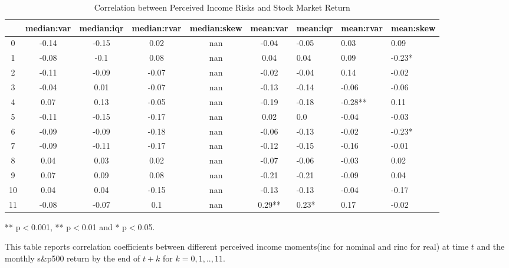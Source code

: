 
\begin{table}[ht]
\centering
\begin{adjustbox}{width={\textwidth}}
\begin{threeparttable}
\caption{Correlation between Perceived Income Risks and Stock Market Return}
\label{macro_corr}
\begin{tabular}{cccccclll}
\toprule
{} & median:var & median:iqr & median:rvar & median:skew & mean:var & mean:iqr & mean:rvar & mean:skew \\
\midrule
0  &      -0.14 &      -0.15 &        0.02 &         nan &    -0.04 &    -0.05 &      0.03 &      0.09 \\
1  &      -0.08 &       -0.1 &        0.08 &         nan &     0.04 &     0.04 &      0.09 &    -0.23* \\
2  &      -0.11 &      -0.09 &       -0.07 &         nan &    -0.02 &    -0.04 &      0.14 &     -0.02 \\
3  &      -0.04 &       0.01 &       -0.07 &         nan &    -0.13 &    -0.14 &     -0.06 &     -0.06 \\
4  &       0.07 &       0.13 &       -0.05 &         nan &    -0.19 &    -0.18 &   -0.28** &      0.11 \\
5  &      -0.11 &      -0.15 &       -0.17 &         nan &     0.02 &      0.0 &     -0.04 &     -0.03 \\
6  &      -0.09 &      -0.09 &       -0.18 &         nan &    -0.06 &    -0.13 &     -0.02 &    -0.23* \\
7  &      -0.09 &      -0.11 &       -0.17 &         nan &    -0.12 &    -0.15 &     -0.16 &     -0.01 \\
8  &       0.04 &       0.03 &        0.02 &         nan &    -0.07 &    -0.06 &     -0.03 &      0.02 \\
9  &       0.07 &       0.09 &        0.08 &         nan &    -0.21 &    -0.21 &     -0.09 &      0.04 \\
10 &       0.04 &       0.04 &       -0.15 &         nan &    -0.13 &    -0.13 &     -0.04 &     -0.17 \\
11 &      -0.08 &      -0.07 &         0.1 &         nan &   0.29** &    0.23* &      0.17 &     -0.02 \\
\bottomrule
\end{tabular}
\begin{tablenotes}
\item *** p$<$0.001, ** p$<$0.01 and * p$<$0.05.
\item This table reports correlation coefficients between different perceived income moments(inc for nominal
and rinc for real) at time
$t$ and the monthly s\&p500 return by the end of $t+k$ for $k=0,1,..,11$.
\end{tablenotes}
\end{threeparttable}
\end{adjustbox}
\end{table}